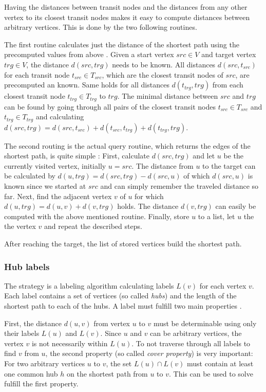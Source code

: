 			Having the distances between transit nodes and the distances from any other vertex to its closest transit nodes makes it easy to compute distances between arbitrary vertices.
			This is done by the two following routines.
			
			The first routine calculates just the distance of the shortest path using the precomputed values from above \cite[7-8]{bast-transit}.
			Given a start vertex $src \in V$ and target vertex $trg \in V$, the distance $d(src, trg)$ needs to be known.
			All distances $d(src, t_{src})$ for each transit node $t_{src} \in T_{src}$, which are the closest transit nodes of $src$, are precomputed an known.
			Same holds for all distances $d(t_{trg}, trg)$ from each closest transit node $t_{trg} \in T_{trg}$ to $trg$.
			The minimal distance between $src$ and $trg$ can be found by going through all pairs of the closest transit nodes $t_{src} \in T_{src}$ and $t_{trg} \in T_{trg}$ and calculating $d(src, trg) = d(src, t_{src}) + d(t_{src}, t_{trg}) + d(t_{trg}, trg)$.
			
			The second routing is the actual query routine, which returns the edges of the shortest path, is quite simple \cite[8]{bast-transit}:
			First, calculate $d(src, trg)$ and let $u$ be the currently visited vertex, initially $u = src$.
			The distance from $u$ to the target can be calculated by $d(u, trg) = d(src, trg) - d(src, u)$ of which $d(src, u)$ is known since we started at $src$ and can simply remember the traveled distance so far.
			Next, find the adjacent vertex $v$ of $u$ for which $d(u, trg) = d(u, v) + d(v, trg)$ holds.
			The distance $d(v, trg)$ can easily be computed with the above mentioned routine.
			Finally, store $u$ to a list, let $u$ the the vertex $v$ and repeat the described steps.
			
			After reaching the target, the list of stored vertices build the shortest path.
		
		\subsubsection{Hub labels}
		
			The  strategy is a labeling algorithm calculating labels $L(v)$ for each vertex $v$.
			Each label contains a set of vertices (so called \emph{hubs}) and the length of the shortest path to each of the hubs.
			A label must fulfill two main properties \cite[11]{bast-transportation-networks}.
			
			First, the distance $d(u, v)$ from vertex $u$ to $v$ must be determinable using only their labels $L(u)$ and $L(v)$.
			Since $u$ and $v$ can be arbitrary vertices, the vertex $v$ is not necessarily within $L(u)$.
			To not traverse through all labels to find $v$ from $u$, the second property (so called \emph{cover property}) is very important:
			For two arbitrary vertices $u$ to $v$, the set $L(u) \cap L(v)$ must contain at least one common hub $h$ on the shortest path from $u$ to $v$.
			This can be used to solve fulfill the first property.
			
